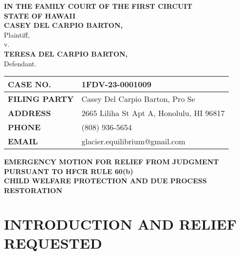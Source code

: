 \documentclass[12pt,letterpaper]{article}
\begin{document}
\begin{center}
{\fontsize{12}{15}\selectfont
\textbf{IN THE FAMILY COURT OF THE FIRST CIRCUIT}\\
\textbf{STATE OF HAWAII}\\
\vspace{0.5in}
\textbf{CASEY DEL CARPIO BARTON,}\\
\vspace{0.1in}
Plaintiff,\\
\vspace{0.1in}
v.\\
\vspace{0.1in}
\textbf{TERESA DEL CARPIO BARTON,}\\
\vspace{0.1in}
Defendant.\\
\vspace{0.2in}
}
\end{center}

\noindent\begin{tabular}{|p{2in}|p{4in}|}
\hline
\textbf{CASE NO.} & \textbf{1FDV-23-0001009} \\
\hline
\textbf{FILING PARTY} & Casey Del Carpio Barton, Pro Se \\
\hline
\textbf{ADDRESS} & 2665 Liliha St Apt A, Honolulu, HI 96817 \\
\hline
\textbf{PHONE} & (808) 936-5654 \\
\hline
\textbf{EMAIL} & glacier.equilibrium@gmail.com \\
\hline
\end{tabular}

\vspace{0.5in}

\begin{center}
{\fontsize{14}{17}\selectfont\textbf{EMERGENCY MOTION FOR RELIEF FROM JUDGMENT}}\\
{\fontsize{14}{17}\selectfont\textbf{PURSUANT TO HFCR RULE 60(b)}}\\
{\fontsize{14}{17}\selectfont\textbf{CHILD WELFARE PROTECTION AND DUE PROCESS RESTORATION}}
\end{center}

\vspace{0.3in}

\section{INTRODUCTION AND RELIEF REQUESTED}
\end{document}
